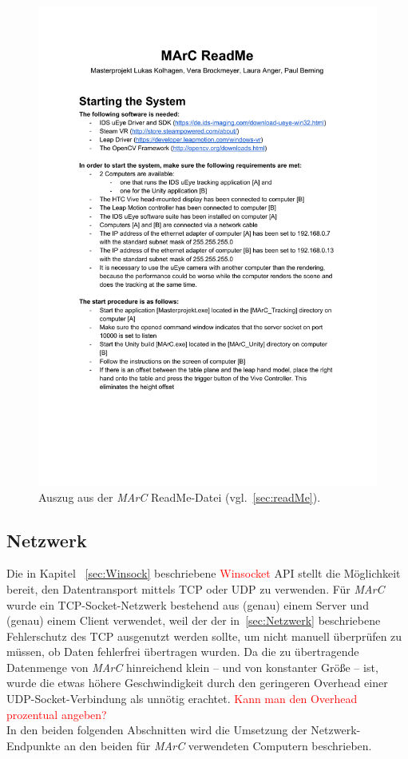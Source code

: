\begin{figure}
	\centering
	\includegraphics[page=1, trim=1cm 12.25cm 1cm 5.25cm, clip, width=\textwidth]{kapitel/anhang/ReadMe.pdf} 
	\caption{Auszug aus der \emph{MArC} ReadMe-Datei (vgl.~\ref{sec:readMe}).}
	\label{fig:marcReadMe}
\end{figure}

\subsection{Netzwerk}\label{sec:netzwerk}
Die in Kapitel ~\ref{sec:Winsock} beschriebene  \textcolor{red}{Winsocket} API stellt die Möglichkeit bereit, den Datentransport mittels TCP oder UDP zu verwenden. Für \emph{MArC} wurde ein TCP-Socket-Netzwerk bestehend aus (genau) einem Server und (genau) einem Client verwendet, weil der der in~\ref{sec:Netzwerk} beschriebene Fehlerschutz des TCP ausgenutzt werden sollte, um nicht manuell überprüfen zu müssen, ob Daten fehlerfrei übertragen wurden. Da die zu übertragende Datenmenge von \emph{MArC} hinreichend klein -- und von konstanter Größe -- ist, wurde die etwas höhere Geschwindigkeit durch den geringeren Overhead einer UDP-Socket-Verbindung als unnötig erachtet. \textcolor{red}{Kann man den Overhead prozentual angeben?} \\
In den beiden folgenden Abschnitten wird die Umsetzung der Netzwerk-Endpunkte an den beiden für \emph{MArC} verwendeten Computern beschrieben.
